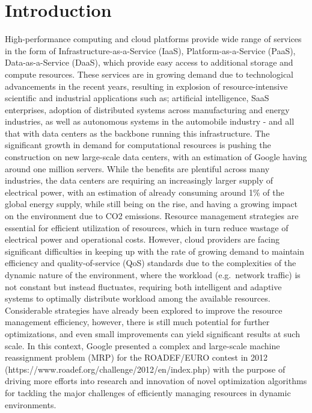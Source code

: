 \documentclass[a4paper,12pt]{Classes/RoboticsLaTeX}
\begin{document}
\tableofcontents
\listoffigures
\listoftables
\printglossary[title=List of Acronyms,type=\acronymtype]
\mainmatter



\chapter{Introduction}\label{chap:introduction}

High-performance computing and cloud platforms provide wide range of services in the form of Infrastructure-as-a-Service (IaaS), Platform-as-a-Service (PaaS), Data-as-a-Service (DaaS), which provide easy access to additional storage and compute resources. These services are in growing demand due to technological advancements in the recent years, resulting in
explosion of resource-intensive scientific and industrial applications
such as; artificial intelligence, SaaS enterprises, adoption of
distributed systems across manufacturing and energy industries, as well
as autonomous systems in the automobile industry - and all that with
data centers as the backbone running this infrastructure. 
\cite{dillonCloudComputingIssues2010}
The significant growth in demand for computational resources is pushing the construction on new large-scale data centers, with an estimation of
Google having around one million servers. 
\cite{bharanySystematicSurveyEnergyEfficient2022}
While the benefits are plentiful across many industries, the data centers are requiring an
increasingly larger supply of electrical power, with an estimation of
already consuming around 1\% of the global energy supply, while still
being on the rise, 
\cite{masanetRecalibratingGlobalData2020}
and having a growing impact on the environment due to CO2 emissions. 
\cite{beloglazovEnergyEfficientResource2010}
Resource management strategies are essential
for efficient utilization of resources, which in turn reduce wastage of
electrical power and operational costs. However, cloud providers are
facing significant difficulties in keeping up with the rate of growing
demand to maintain efficiency and quality-of-service (QoS) standards due
to the complexities of the dynamic nature of the environment, where the
workload (e.g.~network traffic) is not constant but instead fluctuates,
requiring both intelligent and adaptive systems to optimally distribute
workload among the available resources. \cite{dillonCloudComputingIssues2010}
Considerable strategies have already been explored to improve the resource management
efficiency, however, there is still much potential for further
optimizations, and even small improvements can yield significant results
at such scale. \cite{masanetRecalibratingGlobalData2020}
In this context, Google presented a complex and
large-scale machine reassignment problem (MRP) for the ROADEF/EURO
contest in 2012 (https://www.roadef.org/challenge/2012/en/index.php)
with the purpose of driving more efforts into research and innovation of
novel optimization algorithms for tackling the major challenges of
efficiently managing resources in dynamic environments.
\end{document}
